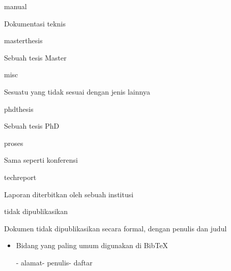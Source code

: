 \begin{itemize}
manual\par




Dokumentasi teknis\par




masterthesis\par




Sebuah tesis Master\par




misc\par




Sesuatu yang tidak sesuai dengan jenis lainnya\par




phdthesis\par




Sebuah tesis PhD\par




proses\par




Sama seperti konferensi\par




techreport\par




Laporan diterbitkan oleh sebuah institusi\par




tidak dipublikasikan\par




Dokumen tidak dipublikasikan secara formal, dengan penulis dan judul\par



\begin{itemize}
	\item Bidang yang paling umum digunakan di BibTeX\hspace*{0.5in}\par

\hspace*{0.5in}- alamat\hspace*{0.5in}\hspace*{0.5in}- penulis\hspace*{0.5in}\hspace*{0.5in}- daftar\par


\end{itemize}
\end{itemize}
